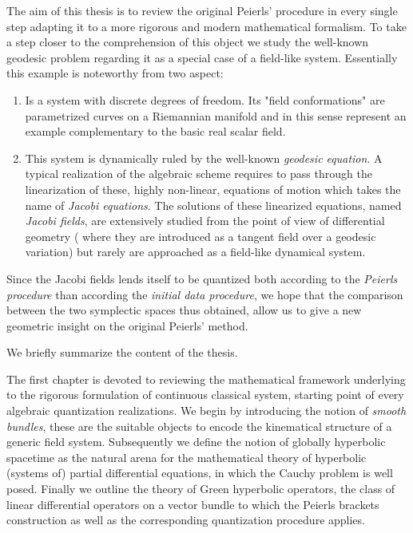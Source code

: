 \documentclass[Main]{subfiles}
\begin{document}
The aim of this thesis is to review the original Peierls' procedure in every single step adapting it to a more rigorous and modern mathematical formalism.
To take a step closer to the comprehension of this object we study the well-known geodesic problem regarding it as a special case of a field-like system.
Essentially this example is noteworthy from two aspect:
\begin{enumerate}
	\item Is a system with discrete degrees of freedom. 
	Its "field conformations" are parametrized curves on a Riemannian manifold and in this sense represent an example complementary to the basic real scalar field.
	\item This system is dynamically ruled by the well-known \emph{geodesic equation}.
		A typical realization of the algebraic scheme requires to pass through the linearization of these, highly non-linear, equations of motion which takes the name of \emph{Jacobi equations}.
		The solutions of these linearized equations, named  \emph{Jacobi fields}, are extensively studied from the point of view of differential geometry  ( where they are introduced as a tangent field over a geodesic variation) but rarely are approached as a field-like dynamical system.
\end{enumerate}
Since the Jacobi fields lends itself to be quantized both according to the \emph{Peierls procedure} than according the \emph{initial data procedure},
we hope that the comparison between the two symplectic spaces thus obtained, allow us to give a new geometric insight on the original Peierls' method.

\vspace{3mm}
We briefly summarize the content of the thesis.

The first chapter is devoted to reviewing the mathematical framework  underlying to the rigorous formulation of continuous classical system, starting point of every algebraic quantization realizations.
We begin by introducing the notion of \emph{smooth bundles}, these are the suitable objects to encode the kinematical structure of a generic field system.
Subsequently we define the notion of globally hyperbolic spacetime as  the natural arena for the mathematical theory of hyperbolic (systems of) partial differential equations, in which the Cauchy problem is well posed.
Finally we outline the theory of Green hyperbolic operators, the class of linear differential operators on a vector bundle to which the Peierls brackets construction as well as the corresponding quantization procedure applies.
\end{document}
